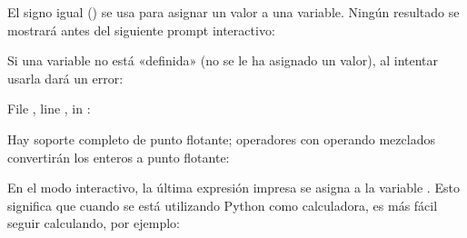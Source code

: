 \documentclass[a4,10pt,spanish]{sphinxmanual}
\begin{document}
\sphinxAtStartPar
El signo igual (\sphinxcode{\sphinxupquote{=}}) se usa para asignar un valor a una variable. Ningún resultado se mostrará antes del siguiente prompt interactivo:

\begin{sphinxVerbatim}[commandchars=\\\{\}]
  
    
  
\end{sphinxVerbatim}

\sphinxAtStartPar
Si una variable no está «definida» (no se le ha asignado un valor), al intentar usarla dará un error:

\begin{sphinxVerbatim}[commandchars=\\\{\}]
  
  File , line , in 
: 
\end{sphinxVerbatim}

\sphinxAtStartPar
Hay soporte completo de punto flotante; operadores con operando mezclados convertirán los enteros a punto flotante:

\begin{sphinxVerbatim}[commandchars=\\\{\}]
    
\end{sphinxVerbatim}

\sphinxAtStartPar
En el modo interactivo, la última expresión impresa se asigna a la variable \sphinxcode{\sphinxupquote{\_}}.  Esto significa que cuando se está utilizando Python como calculadora, es más fácil seguir calculando, por ejemplo:

\begin{sphinxVerbatim}[commandchars=\\\{\}]
    
  
  
  
 
\end{sphinxVerbatim}
\end{document}
